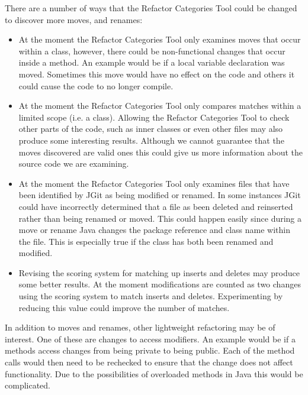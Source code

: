 There are a number of ways that the Refactor Categories Tool could be changed to discover more moves, and renames:

\begin{itemize}

  \item At the moment the Refactor Categories Tool only examines moves that occur within a class, however, there could be non-functional changes that occur inside a method. 
An example would be if a local variable declaration was moved.
Sometimes this move would have no effect on the code and others it could cause the code to no longer compile.
  
  \item At the moment the Refactor Categories Tool only compares matches within a limited scope (i.e. a class).  
Allowing the Refactor Categories Tool to check other parts of the code, such as inner classes or even other files may also produce some interesting results.
Although we cannot guarantee that the moves discovered are valid ones this could give us more information about the source code we are examining.

  \item At the moment the Refactor Categories Tool only examines files that have been identified by JGit as being modified or renamed.
In some instances JGit could have incorrectly determined that a file as been deleted and reinserted rather than being renamed or moved.
This could happen easily since during a move or rename Java changes the package reference and class name within the file.
This is especially true if the class has both been renamed and modified.

  \item Revising the scoring system for matching up inserts and deletes may produce some better results.
At the moment modifications are counted as two changes using the scoring system to match inserts and deletes.
Experimenting by reducing this value could improve the number of matches.

\end{itemize}




   

In addition to moves and renames, other lightweight refactoring may be of interest.
One of these are changes to access modifiers.
An example would be if a methods access changes from being private to being public.
Each of the method calls would then need to be rechecked to ensure that the change does not affect functionality.
Due to the possibilities of overloaded methods in Java this would be complicated.

